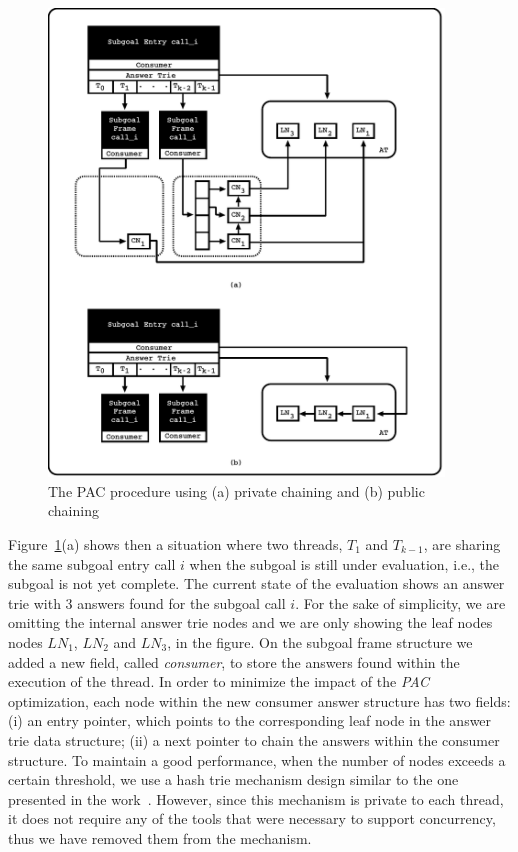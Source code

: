 \documentclass{llncs}
\begin{document}
\begin{figure}[!ht]
\centering
\includegraphics[width=10.5cm]{figures/pcc.pdf}
\caption{The PAC procedure using (a) private chaining and (b) public
  chaining}
\label{fig_tabtries_pcc}
\end{figure}

Figure~\ref{fig_tabtries_pcc}(a) shows then a situation where two
threads, $T_1$ and $T_{k-1}$, are sharing the same subgoal entry call
$i$ when the subgoal is still under evaluation, i.e., the subgoal is
not yet complete. The current state of the evaluation shows an answer
trie with $3$ answers found for the subgoal call $i$. For the sake of
simplicity, we are omitting the internal answer trie nodes and we are
only showing the leaf nodes nodes $LN_1$, $LN_2$ and $LN_3$, in the
figure. %
On the subgoal frame structure we added a new field, called
\emph{consumer}, to store the answers found within the execution of
the thread. In order to minimize the impact of the \emph{PAC}
optimization, each node within the new consumer answer structure has
two fields: (i) an entry pointer, which points to the corresponding
leaf node in the answer trie data structure; (ii) a next pointer to
chain the answers within the consumer structure. To maintain a good
performance, when the number of nodes exceeds a certain threshold, we
use a hash trie mechanism design similar to the one presented in the
work~\cite{Areias-ijpp15}. However, since this mechanism is private to
each thread, it does not require any of the tools that were necessary
to support concurrency, thus we have removed them from the mechanism.
\end{document}
